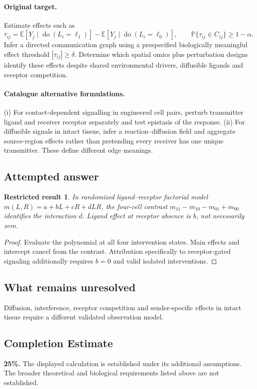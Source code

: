 \documentclass[11pt]{article}
\newcommand{\E}{\mathbb E}
\newcommand{\Prob}{\mathbb P}
\providecommand{\E}{\mathbb E}
\providecommand{\Prob}{\mathbb P}
\newtheorem{attemptresult}{Restricted result}[section]
\begin{document}
\paragraph{Original target.}
Estimate effects such as
\[\tau_{ij}=\E[Y_j\mid\operatorname{do}(L_i=\ell_1)]-\E[Y_j\mid\operatorname{do}(L_i=\ell_0)],\qquad \Prob\{\tau_{ij}\in C_{ij}\}\ge1-\alpha.\]
Infer a directed communication graph using a prespecified biologically meaningful effect threshold $|\tau_{ij}|\ge\delta$. Determine which spatial omics plus perturbation designs identify these effects despite shared environmental drivers, diffusible ligands and receptor competition.
\paragraph{Catalogue alternative formulations.}
(i) For contact-dependent signalling in engineered cell pairs, perturb transmitter ligand and receiver receptor separately and test epistasis of the response. (ii) For diffusible signals in intact tissue, infer a reaction--diffusion field and aggregate source-region effects rather than pretending every receiver has one unique transmitter. These define different edge meanings.
\subsection{Attempted answer}
\begin{attemptresult}
In randomized ligand--receptor factorial model $m(L,R)=a+bL+cR+dLR$, the four-cell contrast $m_{11}-m_{10}-m_{01}+m_{00}$ identifies the interaction $d$. Ligand effect at receptor absence is $b$, not necessarily zero.
\end{attemptresult}
\begin{proof}
Evaluate the polynomial at all four intervention states. Main effects and intercept cancel from the contrast. Attribution specifically to receptor-gated signaling additionally requires $b=0$ and valid isolated interventions.
\end{proof}
\subsection{What remains unresolved}
Diffusion, interference, receptor competition and sender-specific effects in intact tissue require a different validated observation model.
\subsection{Completion Estimate}
\textbf{25\%.} The displayed calculation is established under its additional assumptions. The broader theoretical and biological requirements listed above are not established.
\end{document}
